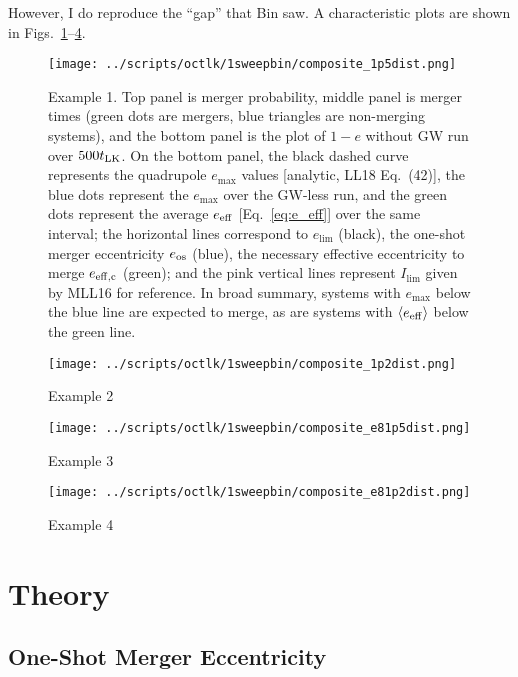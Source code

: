 \documentclass[11pt,
        usenames, %
        dvipsnames %
    ]{article}
\newcommand*{\ev}[1]{\left\langle#1\right\rangle}
\begin{document}
However, I do reproduce the ``gap'' that Bin saw. A characteristic plots are
shown in Figs.~\ref{fig:composite1}--\ref{fig:composite4}.
\begin{figure}
    \centering
    \texttt{[image: ../scripts/octlk/1sweepbin/composite\_1p5dist.png]}
    \caption{Example 1. Top panel is merger probability, middle panel is merger
    times (green dots are mergers, blue triangles are non-merging systems), and
    the bottom panel is the plot of $1 - e$ without GW run over $500t_{\rm LK}$.
    On the bottom panel, the black dashed curve represents the quadrupole
    $e_{\max}$ values [analytic, LL18 Eq.~(42)], the blue dots represent the
    $e_{\max}$ over the GW-less run, and the green dots represent the average
    $e_{\rm eff}$ [Eq.~\eqref{eq:e_eff}] over the same interval; the horizontal
    lines correspond to $e_{\lim}$ (black), the one-shot merger eccentricity
    $e_{\rm os}$ (blue), the necessary effective eccentricity to merge $e_{\rm
    eff, c}$ (green); and the pink vertical lines represent $I_{\lim}$ given by
    MLL16 for reference. In broad summary, systems with $e_{\max}$ below the
    blue line are expected to merge, as are systems with $\ev{e_{\rm eff}}$
    below the green line.}\label{fig:composite1}
\end{figure}
\begin{figure}
    \centering
    \texttt{[image: ../scripts/octlk/1sweepbin/composite\_1p2dist.png]}
    \caption{Example 2}\label{fig:composite2}
\end{figure}
\begin{figure}
    \centering
    \texttt{[image: ../scripts/octlk/1sweepbin/composite\_e81p5dist.png]}
    \caption{Example 3}\label{fig:composite3}
\end{figure}
\begin{figure}
    \centering
    \texttt{[image: ../scripts/octlk/1sweepbin/composite\_e81p2dist.png]}
    \caption{Example 4}\label{fig:composite4}
\end{figure}

\section{Theory}

\subsection{One-Shot Merger Eccentricity}
\end{document}
